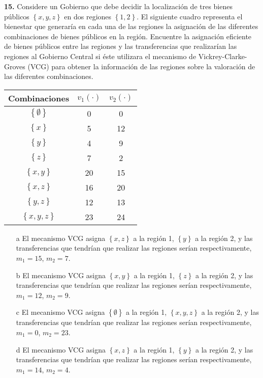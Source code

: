 \documentclass{nuevotema}
\begin{document}
\preguntas


\textbf{15.} Considere un Gobierno que debe decidir la localización de tres bienes públicos $\left\lbrace 
x, y, z \right\rbrace$ en dos regiones $\left\lbrace 1,2 \right\rbrace$. El siguiente cuadro representa el bienestar que generaría en cada una de las regiones la asignación de las diferentes combinaciones de bienes públicos en la región. Encuentre la asignación eficiente de bienes públicos entre las regiones y las transferencias que realizarían las regiones al Gobierno Central si éste utilizara el mecanismo de Vickrey-Clarke-Groves (VCG) para obtener la información de las regiones sobre la valoración de las diferentes combinaciones.

\begin{center}
\begin{tabular}{c c c}
	\\ \hline
	Combinaciones & $v_1(\cdot)$ & $v_2(\cdot)$ \\ \hline
	$\left\lbrace \emptyset \right\rbrace$ & 0 & 0 \\
	$\left\lbrace x \right\rbrace$ & 5 & 12 \\
	$\left\lbrace y \right\rbrace$ & 4 & 9 \\
	$\left\lbrace z \right\rbrace$ & 7 & 2 \\
	$\left\lbrace x,y \right\rbrace$ & 20 & 15 \\
	$\left\lbrace x,z \right\rbrace$ & 16 & 20 \\
	$\left\lbrace y,z \right\rbrace$ & 12 & 13 \\
	$\left\lbrace x,y, z \right\rbrace$ & 23 & 24 \\
\end{tabular}

\end{center}

\begin{itemize}
	\item[a] El mecanismo VCG asigna $\left\lbrace x, z \right\rbrace$ a la región 1, $\left\lbrace y \right\rbrace$ a la región 2, y las transferencias que tendrían que realizar las regiones serían respectivamente, $m_1 = 15$, $m_2 = 7$.
	\item[b] El mecanismo VCG asigna $\left\lbrace x, y \right\rbrace$ a la región 1, $\left\lbrace z \right\rbrace$ a la región 2, y las transferencias que tendrían que realizar las regiones serían respectivamente, $m_1 = 12$, $m_2 = 9$.
	\item[c] El mecanismo VCG asigna $\left\lbrace \emptyset \right\rbrace$ a la región 1, $\left\lbrace x, y, z \right\rbrace$ a la región 2, y las transferencias que tendrían que realizar las regiones serían respectivamente, $m_1 = 0$, $m_2 = 23$.
	\item[d] El mecanismo VCG asigna $\left\lbrace x, z \right\rbrace$ a la región 1, $\left\lbrace y \right\rbrace$ a la región 2, y las transferencias que tendrían que realizar las regiones serían respectivamente, $m_1 = 14$, $m_2 = 4$.
\end{itemize}
\end{document}

